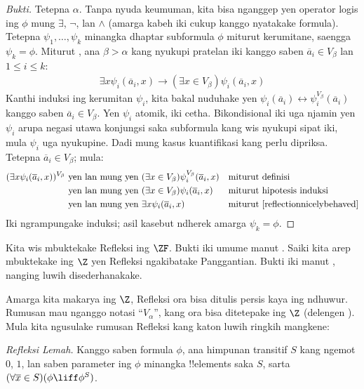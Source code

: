 \documentclass[../../../include/open-logic-section]{subfiles}
\begin{document}
\begin{proof}[Bukti]
Tetepna $\alpha$. Tanpa nyuda keumuman,
kita bisa nganggep yen operator logis ing $\phi$
mung $\exists$, $\lnot$, lan $\land$ (amarga
kabeh iki cukup kanggo nyatakake formula).
Tetepna $\psi_1, \ldots, \psi_k$ minangka
dhaptar subformula $\phi$ miturut
kerumitane, saengga $\psi_k = \phi$.
Miturut , ana
$\beta > \alpha$ kang nyukupi pratelan iki
kanggo saben $\overline{a}_i \in V_\beta$
lan $1 \leq i \leq k$:
\begin{align}\label{reflectionnicelybehaved}
	\exists x\psi_i(\overline{a}_i, x) \rightarrow 
	(\exists x \in V_\beta) \psi_i(\overline{a}_i, x)\tag{*}
\end{align}
Kanthi induksi ing kerumitan $\psi_i$,
kita bakal nuduhake yen
$\psi_i(\overline{a}_i) \leftrightarrow
\psi_i^{V_\beta}(\overline{a}_i)$ kanggo saben
$\overline{a}_i \in V_\beta$. Yen $\psi_i$
atomik, iki cetha. Bikondisional iki uga
njamin yen $\psi_i$ arupa negasi utawa
konjungsi saka subformula kang wis nyukupi
sipat iki, mula $\psi_i$ uga nyukupine.
Dadi mung kasus kuantifikasi kang perlu
dipriksa. Tetepna $\overline{a}_i \in V_\beta$;
mula:
\begin{align*}
	(\exists x \psi_i(\overline{a}_i, x))^{V_\beta}
	&\text{ yen lan mung yen }
	(\exists x \in V_\beta)\psi_i^{V_\beta}(\overline{a}_i, x)
	&&\text{miturut definisi}\\
	&\text{ yen lan mung yen }
	(\exists x \in V_\beta)\psi_i(\overline{a}_i,  x)
	&&\text{miturut hipotesis induksi}\\
	&\text{ yen lan mung yen }
	\exists x \psi_i(\overline{a}_i, x)
	&&\text{miturut \eqref{reflectionnicelybehaved}}
\end{align*}
Iki ngrampungake induksi; asil kasebut
ndherek amarga $\psi_k = \phi$.
\end{proof}

Kita wis mbuktekake Refleksi ing $\ZF$.
Bukti iki umume manut \citet{Montague1961}.
Saiki kita arep mbuktekake ing $\Z$ yen
Refleksi ngakibatake Panggantian. Bukti
iki manut \citet{Levy1960}, nanging luwih
disederhanakake.

Amarga kita makarya ing $\Z$, Refleksi
ora bisa ditulis persis kaya ing ndhuwur.
Rumusan mau nganggo notasi ``$V_\alpha$'',
kang ora bisa ditetepake ing $\Z$ (delengen
). Mula kita
ngusulake rumusan Refleksi kang katon
luwih ringkih mangkene:

\begin{defish}
\emph{Refleksi Lemah.} Kanggo saben formula
$\phi$, ana himpunan transitif $S$ kang ngemot
$0$, $1$, lan saben parameter ing $\phi$
minangka !!{element}s saka $S$, sarta
$(\forall \overline{x} \in S)(\phi \liff
\phi^S)$.
\end{defish}
\end{document}

